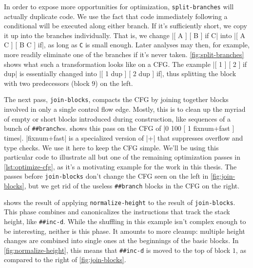 
In order to expose more opportunities for optimization, \Verb|split-branches|
will actually duplicate code.  We use the fact that code immediately following
a conditional will be executed along either branch.  If it's sufficiently
short, we copy it up into the branches individually.  That is, we change
%
\factor|[ A ] [ B ] if C|
%
into
%
\factor|[ A C ] [ B C ] if|,
%
as long as \Verb|C| is small enough.  Later analyses may then, for example,
more readily eliminate one of the branches if it's never taken.
\cref{fig:split-branches} shows what such a transformation looks like on a
\gls{CFG}.  The example
%
\factor|[ 1 ] [ 2 ] if dup|
%
is essentially changed into
%
\factor|[ 1 dup ] [ 2 dup ] if|,
%
thus splitting the block with two predecessors (block $9$) on the left.


The next pass, \Verb|join-blocks|, compacts the \gls{CFG} by joining together
blocks involved in only a single control flow edge.  Mostly, this is to clean
up the myriad of empty or short blocks introduced during construction, like
sequences of a bunch of \Verb|##branch|es.   shows this
pass on the \gls{CFG} of
%
\factor|0 100 [ 1 fixnum+fast ] times|.
%
\factor|fixnum+fast| is a specialized version of \factor|+| that suppresses
overflow and type checks.  We use it here to keep the \gls{CFG} simple.  We'll
be using this particular code to illustrate all but one of the remaining
optimization passes in \cref{lst:optimize-cfg}, as it's a motivating example
for the work in this thesis.  The passes before \Verb|join-blocks| don't
change the \gls{CFG} seen on the left in \cref{fig:join-blocks}, but we get rid
of the useless \Verb|##branch| blocks in the \gls{CFG} on the right.


 shows the result of applying
\Verb|normalize-height| to the result of \Verb|join-blocks|.  This phase
combines and canonicalizes the instructions that track the stack height, like
\Verb|##inc-d|.  While the shuffling in this example isn't complex enough to
be interesting, neither is this phase.  It amounts to more cleanup: multiple
height changes are combined into single ones at the beginnings of the basic
blocks.  In \cref{fig:normalize-height}, this means that \Verb|##inc-d| is
moved to the top of block $1$, as compared to the right of
\cref{fig:join-blocks}.

